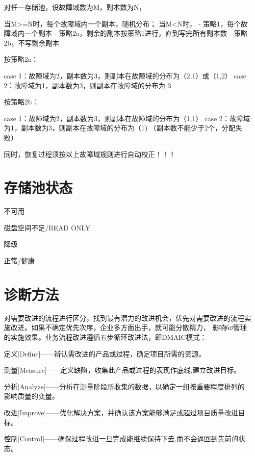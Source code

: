 对任一存储池，设故障域数为M，副本数为N，

当M>=N时，每个故障域内一个副本，随机分布；
当M<N时，
- 策略1，每个故障域内一个副本
- 策略2a，剩余的副本按策略1进行，直到写完所有副本数
- 策略2b，不写剩余副本

按策略2a：

case 1：故障域为2，副本数为3，则副本在故障域的分布为（2,1）或（1,2）
case 2：故障域为1，副本数为3，则副本在故障域的分布为 3

按策略2b：

case 1：故障域为2，副本数为3，则副本在故障域的分布为（1,1）
case 2：故障域为1，副本数为3，则副本在故障域的分布为（1) （副本数不能少于2个，分配失败）

同时，恢复过程须按以上故障域规则进行自动校正！！！

\section{存储池状态}

\begin{compactenum}
\item 不可用
\item 磁盘空间不足/READ ONLY
\item 降级
\item 正常/健康
\end{compactenum}

\section{诊断方法}

对需要改进的流程进行区分，找到最有潜力的改进机会，优先对需要改进的流程实施改进。如果不确定优先次序，企业多方面出手，就可能分散精力，
影响6σ管理的实施效果。业务流程改进遵循五步循环改进法，即DMAIC模式：

\begin{compactenum}
\item 定义[Define]——辨认需改进的产品或过程，确定项目所需的资源。
\item 测量[Measure]——定义缺陷，收集此产品或过程的表现作底线,建立改进目标。
\item 分析[Analyze]——分析在测量阶段所收集的数据，以确定一组按重要程度排列的影响质量的变量。
\item 改进[Improve]——优化解决方案，并确认该方案能够满足或超过项目质量改进目标。
\item 控制[Control]——确保过程改进一旦完成能继续保持下去,而不会返回到先前的状态。
\end{compactenum}

